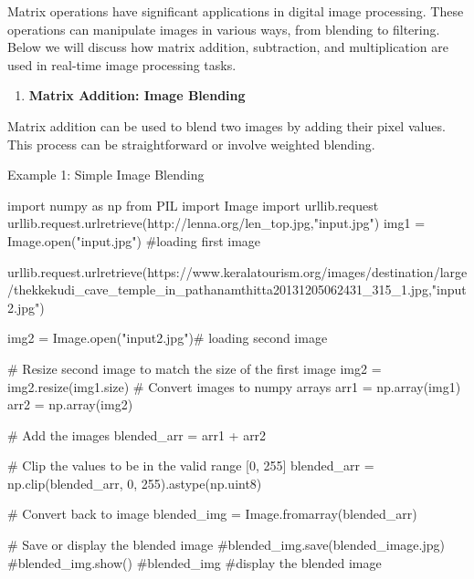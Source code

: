 \documentclass[
  letterpaper,
  DIV=11,
  numbers=noendperiod]{scrreprt}
\newenvironment{Shaded}{\begin{snugshade}}{\end{snugshade}}
\newcommand{\BuiltInTok}[1]{\textcolor[rgb]{0.00,0.23,0.31}{#1}}
\newcommand{\CommentTok}[1]{\textcolor[rgb]{0.37,0.37,0.37}{#1}}
\newcommand{\DecValTok}[1]{\textcolor[rgb]{0.68,0.00,0.00}{#1}}
\newcommand{\ImportTok}[1]{\textcolor[rgb]{0.00,0.46,0.62}{#1}}
\newcommand{\NormalTok}[1]{\textcolor[rgb]{0.00,0.23,0.31}{#1}}
\newcommand{\OperatorTok}[1]{\textcolor[rgb]{0.37,0.37,0.37}{#1}}
\newcommand{\StringTok}[1]{\textcolor[rgb]{0.13,0.47,0.30}{#1}}
\providecommand{\tightlist}{%
  \setlength{\itemsep}{0pt}\setlength{\parskip}{0pt}}\usepackage{longtable,booktabs,array}
\theoremstyle{plain}
\theoremstyle{definition}
\theoremstyle{remark}
\begin{document}
Matrix operations have significant applications in digital image
processing. These operations can manipulate images in various ways, from
blending to filtering. Below we will discuss how matrix addition,
subtraction, and multiplication are used in real-time image processing
tasks.

\begin{enumerate}
\def\labelenumi{\arabic{enumi}.}
\tightlist
\item
  \textbf{Matrix Addition: Image Blending}
\end{enumerate}

Matrix addition can be used to blend two images by adding their pixel
values. This process can be straightforward or involve weighted
blending.

Example 1: Simple Image Blending

\begin{Shaded}
\begin{Highlighting}[]
\ImportTok{import}\NormalTok{ numpy }\ImportTok{as}\NormalTok{ np}
\ImportTok{from}\NormalTok{ PIL }\ImportTok{import}\NormalTok{ Image}
\ImportTok{import}\NormalTok{ urllib.request}
\NormalTok{urllib.request.urlretrieve(}\StringTok{\textquotesingle{}http://lenna.org/len\_top.jpg\textquotesingle{}}\NormalTok{,}\StringTok{"input.jpg"}\NormalTok{)}
\NormalTok{img1 }\OperatorTok{=}\NormalTok{ Image.}\BuiltInTok{open}\NormalTok{(}\StringTok{"input.jpg"}\NormalTok{) }\CommentTok{\#loading first image}

\NormalTok{urllib.request.urlretrieve(}\StringTok{\textquotesingle{}https://www.keralatourism.org/images/destination/large/thekkekudi\_cave\_temple\_in\_pathanamthitta20131205062431\_315\_1.jpg\textquotesingle{}}\NormalTok{,}\StringTok{"input2.jpg"}\NormalTok{)}

\NormalTok{img2 }\OperatorTok{=}\NormalTok{ Image.}\BuiltInTok{open}\NormalTok{(}\StringTok{"input2.jpg"}\NormalTok{)}\CommentTok{\# loading second image}

\CommentTok{\# Resize second image to match the size of the first image}
\NormalTok{img2 }\OperatorTok{=}\NormalTok{ img2.resize(img1.size)}
\CommentTok{\# Convert images to numpy arrays}
\NormalTok{arr1 }\OperatorTok{=}\NormalTok{ np.array(img1)}
\NormalTok{arr2 }\OperatorTok{=}\NormalTok{ np.array(img2)}

\CommentTok{\# Add the images}
\NormalTok{blended\_arr }\OperatorTok{=}\NormalTok{ arr1 }\OperatorTok{+}\NormalTok{ arr2}

\CommentTok{\# Clip the values to be in the valid range [0, 255]}
\NormalTok{blended\_arr }\OperatorTok{=}\NormalTok{ np.clip(blended\_arr, }\DecValTok{0}\NormalTok{, }\DecValTok{255}\NormalTok{).astype(np.uint8)}

\CommentTok{\# Convert back to image}
\NormalTok{blended\_img }\OperatorTok{=}\NormalTok{ Image.fromarray(blended\_arr)}

\CommentTok{\# Save or display the blended image}
\CommentTok{\#blended\_img.save(\textquotesingle{}blended\_image.jpg\textquotesingle{})}
\CommentTok{\#blended\_img.show()}
\CommentTok{\#blended\_img \#display the blended image}
\end{Highlighting}
\end{Shaded}
\end{document}
